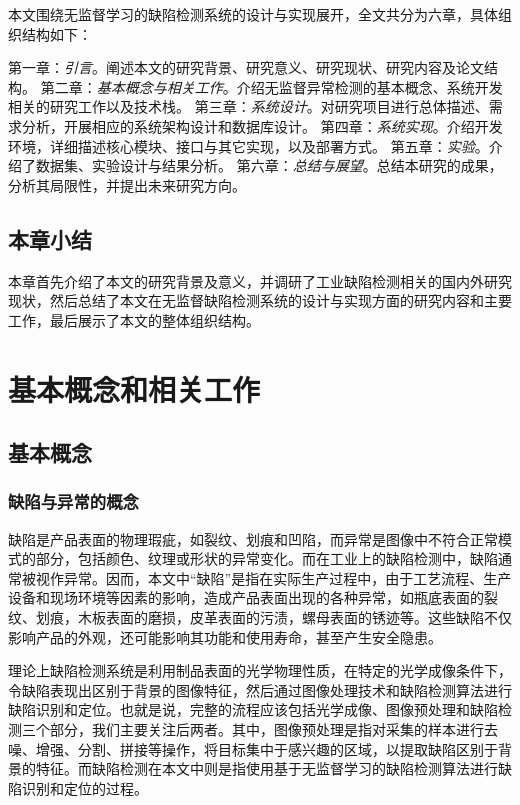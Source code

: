 \documentclass[
  ]{njuthesis}
\begin{document}
本文围绕无监督学习的缺陷检测系统的设计与实现展开，全文共分为六章，具体组织结构如下：  

第一章：\textit{引言}。阐述本文的研究背景、研究意义、研究现状、研究内容及论文结构。
第二章：\textit{基本概念与相关工作}。介绍无监督异常检测的基本概念、系统开发相关的研究工作以及技术栈。
第三章：\textit{系统设计}。对研究项目进行总体描述、需求分析，开展相应的系统架构设计和数据库设计。
第四章：\textit{系统实现}。介绍开发环境，详细描述核心模块、接口与其它实现，以及部署方式。
第五章：\textit{实验}。介绍了数据集、实验设计与结果分析。
第六章：\textit{总结与展望}。总结本研究的成果，分析其局限性，并提出未来研究方向。 

\section{本章小结}

本章首先介绍了本文的研究背景及意义，并调研了工业缺陷检测相关的国内外研究现状，然后总结了本文在无监督缺陷检测系统的设计与实现方面的研究内容和主要工作，最后展示了本文的整体组织结构。

\chapter{基本概念和相关工作}

\section{基本概念}

\subsection{缺陷与异常的概念}

缺陷是产品表面的物理瑕疵，如裂纹、划痕和凹陷，而异常是图像中不符合正常模式的部分，包括颜色、纹理或形状的异常变化\cite{[6]}。而在工业上的缺陷检测中，缺陷通常被视作异常。因而，本文中“缺陷”是指在实际生产过程中，由于工艺流程、生产设备和现场环境等因素的影响，造成产品表面出现的各种异常\cite{[4]}，如瓶底表面的裂纹、划痕，木板表面的磨损，皮革表面的污渍，螺母表面的锈迹等。这些缺陷不仅影响产品的外观，还可能影响其功能和使用寿命，甚至产生安全隐患。

理论上缺陷检测系统是利用制品表面的光学物理性质，在特定的光学成像条件下，令缺陷表现出区别于背景的图像特征，然后通过图像处理技术和缺陷检测算法进行缺陷识别和定位\cite{[7]}。也就是说，完整的流程应该包括光学成像、图像预处理和缺陷检测三个部分，我们主要关注后两者。其中，图像预处理是指对采集的样本进行去噪、增强、分割、拼接等操作，将目标集中于感兴趣的区域，以提取缺陷区别于背景的特征。而缺陷检测在本文中则是指使用基于无监督学习的缺陷检测算法进行缺陷识别和定位的过程。
\end{document}
